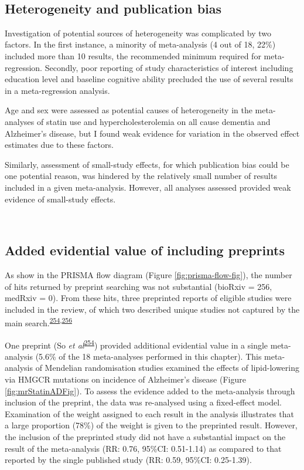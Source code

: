 \documentclass[a4paper, twoside]{templates/ociamthesis}
\begin{document}
~

\hypertarget{heterogeneity-and-publication-bias}{%
\subsection{Heterogeneity and publication bias}\label{heterogeneity-and-publication-bias}}

Investigation of potential sources of heterogeneity was complicated by two factors. In the first instance, a minority of meta-analysis (4 out of 18, 22\%) included more than 10 results, the recommended minimum required for meta-regression. Secondly, poor reporting of study characteristics of interest including education level and baseline cognitive ability precluded the use of several results in a meta-regression analysis.

Age and sex were assessed as potential causes of heterogeneity in the meta-analyses of statin use and hypercholesterolemia on all cause dementia and Alzheimer's disease, but I found weak evidence for variation in the observed effect estimates due to these factors.

Similarly, assessment of small-study effects, for which publication bias could be one potential reason, was hindered by the relatively small number of results included in a given meta-analysis. However, all analyses assessed provided weak evidence of small-study effects.

~

\hypertarget{sys-rev-including-preprints-res}{%
\subsection{Added evidential value of including preprints}\label{sys-rev-including-preprints-res}}

As show in the PRISMA flow diagram (Figure \ref{fig:prisma-flow-fig}), the number of hits returned by preprint searching was not substantial (bioRxiv = 256, medRxiv = 0). From these hits, three preprinted reports of eligible studies were included in the review, of which two described unique studies not captured by the main search.\textsuperscript{\protect\hyperlink{ref-so2017}{254},\protect\hyperlink{ref-andrews2019}{256}}

One preprint (So \emph{et al}\textsuperscript{\protect\hyperlink{ref-so2017}{254}}) provided additional evidential value in a single meta-analysis (5.6\% of the 18 meta-analyses performed in this chapter). This meta-analysis of Mendelian randomisation studies examined the effects of lipid-lowering via HMGCR mutations on incidence of Alzheimer's disease (Figure \ref{fig:mrStatinADFig}). To assess the evidence added to the meta-analysis through inclusion of the preprint, the data was re-analysed using a fixed-effect model. Examination of the weight assigned to each result in the analysis illustrates that a large proportion (78\%) of the weight is given to the preprinted result. However, the inclusion of the preprinted study did not have a substantial impact on the result of the meta-analysis (RR: 0.76, 95\%CI: 0.51-1.14) as compared to that reported by the single published study (RR: 0.59, 95\%CI: 0.25-1.39).
\end{document}
